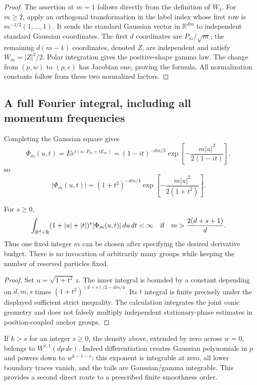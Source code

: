 \begin{proof}
The assertion at $m=1$ follows directly from the definition of $W_1$. For $m\ge2$, apply an orthogonal transformation in the label index whose first row is $m^{-1/2}(1,\ldots,1)$. It sends the standard Gaussian vector in $\mathbb R^{dm}$ to independent standard Gaussian coordinates. The first $d$ coordinates are $P_m/\sqrt m$; the remaining $d(m-1)$ coordinates, denoted $Z$, are independent and satisfy $W_m=|Z|^2/2$. Polar integration gives the positive-shape gamma law. The change from $(p,w)$ to $(p,e)$ has Jacobian one, proving the formula. All normalization constants follow from these two normalized factors.
\end{proof}

\subsection{A full Fourier integral, including all momentum frequencies}
Completing the Gaussian square gives
\[
 \Phi_m(u,t)=E e^{i(u\cdot P_m+tE_m)}
 =(1-it)^{-dm/2}\exp\left[-\frac{m|u|^2}{2(1-it)}\right],
\]
so
\[
 |\Phi_m(u,t)|=(1+t^2)^{-dm/4}
       \exp\left[-\frac{m|u|^2}{2(1+t^2)}\right].
\]

\begin{theorem}
\label{thm:r33-b1-fourier}
For $s\ge0$,
\[
 \int_{\mathbb R^d\times\mathbb R}
  (1+|u|+|t|)^s|\Phi_m(u,t)|\,du\,dt<\infty
 \quad\hbox{if}\quad m>\frac{2(d+s+1)}d.
\]
Thus one fixed integer $m$ can be chosen after specifying the desired derivative budget. There is no invocation of arbitrarily many groups while keeping the number of reserved particles fixed.
\end{theorem}

\begin{proof}
Set $u=\sqrt{1+t^2}\,z$. The inner integral is bounded by a constant depending on $d,m,s$ times
$(1+t^2)^{(d+s)/2-dm/4}$. Its $t$ integral is finite precisely under the displayed sufficient strict inequality. The calculation integrates the joint conic geometry and does not falsely multiply independent stationary-phase estimates in position-coupled anchor groups.
\end{proof}

If $k>s$ for an integer $s\ge0$, the density above, extended by zero across $w=0$, belongs to $W^{s,1}(dp\,de)$. Indeed differentiation creates Gaussian polynomials in $p$ and powers down to $w^{k-1-s}$; this exponent is integrable at zero, all lower boundary traces vanish, and the tails are Gaussian/gamma integrable. This provides a second direct route to a prescribed finite smoothness order.

